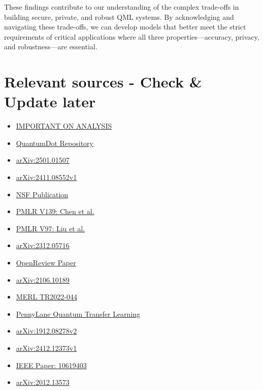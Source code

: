 \documentclass[11pt, conference]{IEEEtran}
\begin{document}
These findings contribute to our understanding of the complex trade-offs in building secure, private, and robust QML systems. By acknowledging and navigating these trade-offs, we can develop models that better meet the strict requirements of critical applications where all three properties—accuracy, privacy, and robustness—are essential.




\section{Relevant sources - Check \& Update later}


\begin{itemize}
    \item \href{https://proceedings.mlr.press/v97/wang19i/wang19i.pdf}{IMPORTANT ON ANALYSIS}
    \item \href{https://github.com/jqi41/QuantumDot/tree/main}{QuantumDot Repository}
    \item \href{https://arxiv.org/pdf/2501.01507}{arXiv:2501.01507}
    \item \href{https://arxiv.org/pdf/2411.08552v1}{arXiv:2411.08552v1}
    \item \href{https://par.nsf.gov/servlets/purl/10427896}{NSF Publication}
    \item \href{http://proceedings.mlr.press/v139/chen21k/chen21k.pdf}{PMLR V139: Chen et al.}
    \item \href{http://proceedings.mlr.press/v97/liu19b/liu19b.pdf}{PMLR V97: Liu et al.}
    \item \href{https://arxiv.org/pdf/2312.05716}{arXiv:2312.05716}
    \item \href{https://openreview.net/pdf?id=ryebG04YvB}{OpenReview Paper}
    \item \href{https://arxiv.org/pdf/2106.10189}{arXiv:2106.10189}
    \item \href{https://www.merl.com/publications/docs/TR2022-044.pdf}{MERL TR2022-044}
    \item \href{https://pennylane.ai/qml/demos/tutorial_quantum_transfer_learning}{PennyLane Quantum Transfer Learning}
    \item \href{https://arxiv.org/pdf/1912.08278v2}{arXiv:1912.08278v2}
    \item \href{https://arxiv.org/pdf/2412.12373v1}{arXiv:2412.12373v1}
    \item \href{https://ieeexplore.ieee.org/document/10619403}{IEEE Paper: 10619403}
    \item \href{https://arxiv.org/pdf/2012.13573}{arXiv:2012.13573}

\end{itemize}
\end{document}

